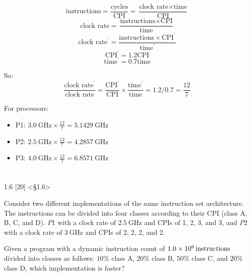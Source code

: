\documentclass[paper=a4, fontsize=11pt]{scrartcl} %
\begin{document}
\begin{enumerate}
  $$\text{instructions} = \frac{\text{cycles}}{\text{CPI}}
  = \frac{\text{clock rate}\times\text{time}}{\text{CPI}}$$
  $$\text{clock rate}
  = \frac{\text{instructions}\times\text{CPI}}{\text{time}}$$
  $$\text{clock rate}^{\prime}
  = \frac{\text{instructions}\times\text{CPI}^{\prime}}{\text{time}^{\prime}}$$
  $$\text{CPI}^{\prime} = 1.2\text{CPI}$$
  $$\text{time}^{\prime} = 0.7\text{time}$$

  So:
  $$\frac{\text{clock rate}^{\prime}}{\text{clock rate}}
  = \frac{\text{CPI}^{\prime}}{\text{CPI}}\times
  \frac{\text{time}^{\prime}}{\text{time}}
  = 1.2 / 0.7 = \frac{12}{7}$$

  For processors:
  \begin{itemize}
  \item{P1:} $\SI{3.0}{\giga\hertz}\times\frac{12}{7} =
    \SI{5.1429}{\giga\hertz}$
  \item{P2:} $\SI{2.5}{\giga\hertz}\times\frac{12}{7} =
    \SI{4.2857}{\giga\hertz}$
  \item{P3:} $\SI{4.0}{\giga\hertz}\times\frac{12}{7} =
    \SI{6.8571}{\giga\hertz}$
  \end{itemize}

\end{enumerate}


\pagebreak

\section{}

\begin{fancyquotes}
  1.6 [20] <§1.6>

  Consider two different implementations of the same instruction set
  architecture. The instructions can be divided into four classes
  according to their CPI (class A, B, C, and D). $P1$ with a clock rate
  of $\SI{2.5}{\giga\hertz}$ and CPIs of 1, 2, 3, and 3, and $P2$ with
  a clock rate of $\SI{3}{\giga\hertz}$ and CPIs of 2, 2, 2, and 2.

  Given a program with a dynamic instruction count of
  $\SI{1.0E6}{instructions}$ divided into classes as follows: $10\%$
  class A, $20\%$ class B, $50\%$ class C, and $20\%$ class D, which
  implementation is faster?
\end{fancyquotes}
\end{document}

